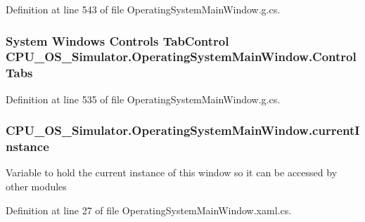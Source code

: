 Definition at line 543 of file Operating\+System\+Main\+Window.\+g.\+cs.

\hypertarget{class_c_p_u___o_s___simulator_1_1_operating_system_main_window_aad49944b6a55d895806ca01be83440e7}{}
\subsubsection[{Control\+Tabs}]{\setlength{\rightskip}{0pt plus 5cm}System Windows Controls Tab\+Control C\+P\+U\+\_\+\+O\+S\+\_\+\+Simulator.\+Operating\+System\+Main\+Window.\+Control\+Tabs\hspace{0.3cm}{\ttfamily [package]}}\label{class_c_p_u___o_s___simulator_1_1_operating_system_main_window_aad49944b6a55d895806ca01be83440e7}


Definition at line 535 of file Operating\+System\+Main\+Window.\+g.\+cs.

\hypertarget{class_c_p_u___o_s___simulator_1_1_operating_system_main_window_ac659b34226b30276331daba60ec7d439}{}
\subsubsection[{current\+Instance}]{ C\+P\+U\+\_\+\+O\+S\+\_\+\+Simulator.\+Operating\+System\+Main\+Window.\+current\+Instance\hspace{0.3cm}{\ttfamily [static]}}\label{class_c_p_u___o_s___simulator_1_1_operating_system_main_window_ac659b34226b30276331daba60ec7d439}


Variable to hold the current instance of this window so it can be accessed by other modules 



Definition at line 27 of file Operating\+System\+Main\+Window.\+xaml.\+cs.

